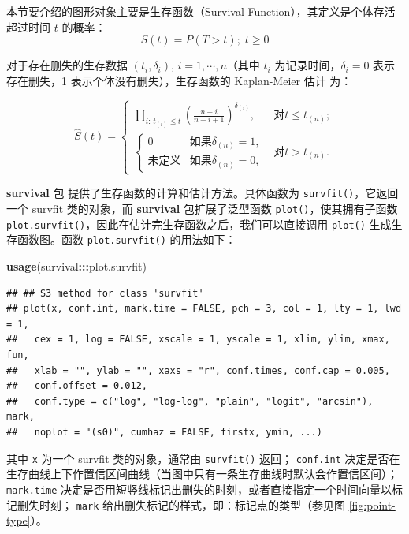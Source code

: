 \documentclass[
  b5paper,
  UTF8,twoside]{book}
\newenvironment{Shaded}{\begin{snugshade}}{\end{snugshade}}
\newcommand{\FunctionTok}[1]{\textcolor[rgb]{0.13,0.29,0.53}{\textbf{#1}}}
\newcommand{\NormalTok}[1]{#1}
\newcommand{\SpecialCharTok}[1]{\textcolor[rgb]{0.81,0.36,0.00}{\textbf{#1}}}
\begin{document}
本节要介绍的图形对象主要是生存函数（Survival Function），其定义是个体存活超过时间 \(t\) 的概率： \[S(t)=P(T>t);\; t\geq0\]

对于存在删失的生存数据 \((t_{i},\delta_{i}),\, i=1,\cdots,n\)（其中 \(t_{i}\) 为记录时间，\(\delta_{i}=0\) 表示存在删失，1 表示个体没有删失），生存函数的 Kaplan-Meier 估计 \citep{Kaplan58} 为：

\[\hat{S}(t)=\left\{ \begin{array}{ll}
\prod_{i:\, t_{(i)}\leq t}(\frac{n-i}{n-i+1})^{\delta_{(i)}}, & \mbox{对}t\leq t_{(n)};\\
\left\{ \begin{array}{ll}
0 & \mbox{如果}\delta_{(n)}=1,\\
\mbox{未定义} & \mbox{如果}\delta_{(n)}=0,
\end{array}\right. & \mbox{对}t>t_{(n)}.
\end{array}\right.\]

\textbf{survival} 包 \citep{survival} 提供了生存函数的计算和估计方法。具体函数为 \texttt{survfit()}，它返回一个 survfit 类的对象，而 \textbf{survival} 包扩展了泛型函数 \texttt{plot()}，使其拥有子函数 \texttt{plot.survfit()}，因此在估计完生存函数之后，我们可以直接调用 \texttt{plot()} 生成生存函数图。函数 \texttt{plot.survfit()} 的用法如下：

\begin{Shaded}
\begin{Highlighting}[]
\FunctionTok{usage}\NormalTok{(survival}\SpecialCharTok{:::}\NormalTok{plot.survfit)}
\end{Highlighting}
\end{Shaded}

\begin{verbatim}
## ## S3 method for class 'survfit'
## plot(x, conf.int, mark.time = FALSE, pch = 3, col = 1, lty = 1, lwd = 1,
##   cex = 1, log = FALSE, xscale = 1, yscale = 1, xlim, ylim, xmax, fun,
##   xlab = "", ylab = "", xaxs = "r", conf.times, conf.cap = 0.005,
##   conf.offset = 0.012,
##   conf.type = c("log", "log-log", "plain", "logit", "arcsin"), mark,
##   noplot = "(s0)", cumhaz = FALSE, firstx, ymin, ...)
\end{verbatim}

其中 \texttt{x} 为一个 survfit 类的对象，通常由 \texttt{survfit()} 返回； \texttt{conf.int} 决定是否在生存曲线上下作置信区间曲线（当图中只有一条生存曲线时默认会作置信区间）； \texttt{mark.time} 决定是否用短竖线标记出删失的时刻，或者直接指定一个时间向量以标记删失时刻； \texttt{mark} 给出删失标记的样式，即：标记点的类型（参见图 \ref{fig:point-type}）。
\end{document}
